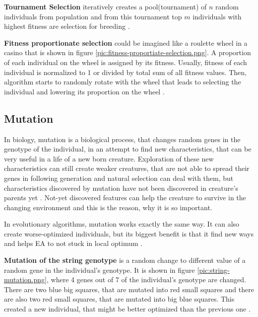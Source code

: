 
\textbf{Tournament Selection} iteratively creates a pool(tournament) of $n$ random individuals from population and from this tournament top $m$ individuals with highest fitness are selection for breeding \cite{evolutionary-algorithms}.

\textbf{Fitness proportionate selection} could be imagined like a roulette wheel in a casino that is shown in figure  \ref{pic:fitness-proportiate-selection.png}. A proportion of each individual on the wheel is assigned by its fitness. Usually, fitness of each individual is normalized to 1 or divided by total sum of all fitness values. Then, algorithm starts to randomly rotate with the wheel that leads to selecting the individual and lowering its proportion on the wheel \cite{evolutionary-algorithms}.

\subsection{Mutation}
In biology, mutation is a biological process, that changes random genes in the genotype of the individual, in an attempt to find new characteristics, that can be very useful in a life of a new born creature. Exploration of these new characteristics can still create weaker creatures, that are not able to spread their genes in following generation and natural selection can deal with them, but characteristics discovered by mutation have not been discovered in creature's parents yet \cite{evolutionary-algorithms}. Not-yet discovered features can help the creature to survive in the changing environment and this is the reason, why it is so important.

In evolutionary algorithms, mutation works exactly the same way. It can also create worse-optimized individuals, but its biggest benefit is that it find new ways and helps EA to not stuck in local optimum \cite{evolutionary-algorithms}.

\textbf{Mutation of the string genotype} is a random change to different value of a random gene in the individual's genotype. It is shown in figure \ref{pic:string-mutation.png}, where 4 genes out of 7 of the individual's genotype are changed. There are two blue big squares, that are mutated into red small squares and there are also two red small squares, that are mutated into big blue squares. This created a new individual, that might be better optimized than the previous one \cite{evolutionary-algorithms}.

